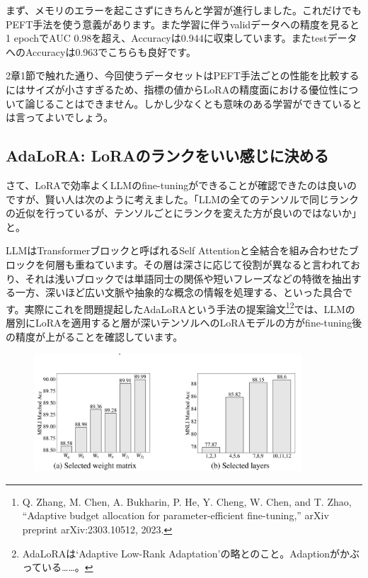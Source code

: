 \documentclass[a5paper,twoside,dvipdfmx]{jsarticle}
\begin{document}
まず、メモリのエラーを起こさずにきちんと学習が進行しました。これだけでもPEFT手法を使う意義があります。また学習に伴うvalidデータへの精度を見ると1 epochでAUC 0.98を超え、Accuracyは0.944に収束しています。またtestデータへのAccuracyは0.963でこちらも良好です。

2章1節で触れた通り、今回使うデータセットはPEFT手法ごとの性能を比較するにはサイズが小さすぎるため、指標の値からLoRAの精度面における優位性について論じることはできません。しかし少なくとも意味のある学習ができているとは言ってよいでしょう。

\subsection{AdaLoRA: LoRAのランクをいい感じに決める}

さて、LoRAで効率よくLLMのfine-tuningができることが確認できたのは良いのですが、賢い人は次のように考えました。「LLMの全てのテンソルで同じランクの近似を行っているが、テンソルごとにランクを変えた方が良いのではないか」と。

LLMはTransformerブロックと呼ばれるSelf Attentionと全結合を組み合わせたブロックを何層も重ねています。その層は深さに応じて役割が異なると言われており、それは浅いブロックでは単語同士の関係や短いフレーズなどの特徴を抽出する一方、深いほど広い文脈や抽象的な概念の情報を処理する、といった具合です。実際にこれを問題提起した\textsf{AdaLoRA}という手法の提案論文\footnote{Q. Zhang, M. Chen, A. Bukharin, P. He, Y. Cheng, W. Chen, and  T. Zhao, “Adaptive budget allocation for parameter-efficient fine-tuning,” arXiv preprint arXiv:2303.10512, 2023. }\footnote{AdaLoRAは`Adaptive Low-Rank Adaptation'の略とのこと。Adaptionがかぶっている……。}では、LLMの層別にLoRAを適用すると層が深いテンソルへのLoRAモデルの方がfine-tuning後の精度が上がることを確認しています。

\newpage

\begin{figure}[h]
  \centering
  \includegraphics[width=100mm]{../C105Fig/gray/adalora_layers.png}
 \end{figure} 
\end{document}

